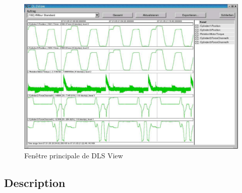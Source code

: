 \documentclass[a4paper,12pt,BCOR6mm,bibtotoc,idxtotoc]{scrbook}
\begin{document}
\begin{figure}[tbh]
  \begin{center}
    \includegraphics[width=\textwidth]{bilder/view_normal}
  \end{center}
  \caption{Fen\^etre principale de DLS View}
  \label{fig:dls_view_main}
\end{figure}


\subsection{Description}
\end{document}
